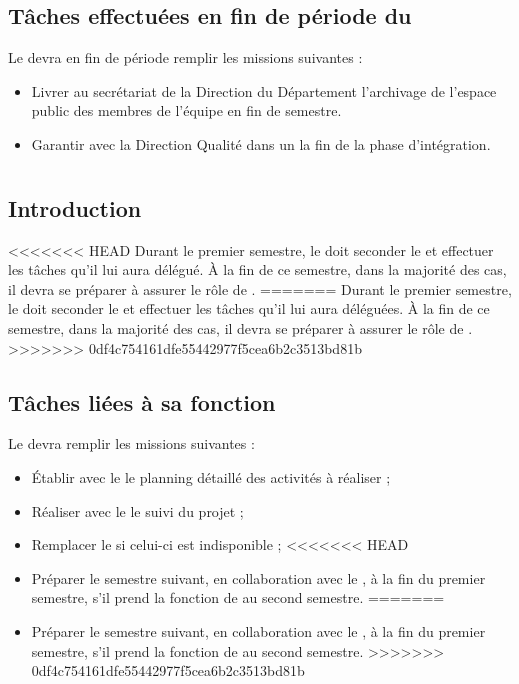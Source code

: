\subsection*{Tâches effectuées en fin de période du \PICCourt}

Le \CP{} devra en fin de période remplir les missions suivantes :
\begin{itemize}
	\item Livrer au secrétariat de la Direction du Département \ASICourt{} l’archivage de l’espace public des membres de l’équipe en fin de semestre.
	\item Garantir avec la Direction Qualité dans un \PVCourt{} la fin de la phase d’intégration.
\end{itemize}
\newpage

\section{\CPA}
\subsection*{Introduction}

<<<<<<< HEAD
Durant le premier semestre, le \CPA{} doit seconder le \CP{} et effectuer les tâches qu’il lui aura délégué. À la fin de ce semestre, dans la majorité des cas, il devra se préparer à assurer le rôle de \CP.
=======
Durant le premier semestre, le \CPA{} doit seconder le \CP{} et effectuer les tâches qu’il lui aura déléguées. À la fin de ce semestre, dans la majorité des cas, il devra se préparer à assurer le rôle de \CP.
>>>>>>> 0df4c754161dfe55442977f5cea6b2c3513bd81b

\subsection*{Tâches liées à sa fonction}

Le \CPA{} devra remplir les missions suivantes :
\begin{itemize}
	\item Établir avec le \CP{} le planning détaillé des activités à réaliser ;
	\item Réaliser avec le \CP{} le suivi du projet ;
	\item Remplacer le \CP{} si celui-ci est indisponible ;
<<<<<<< HEAD
	\item Préparer le semestre suivant, en collaboration avec le \CP, à la fin du premier semestre, s’il prend la fonction de \CP{} au second semestre.
=======
	\item Préparer le semestre suivant, en collaboration avec le \CP{}, à la fin du premier semestre, s’il prend la fonction de \CP{} au second semestre.
>>>>>>> 0df4c754161dfe55442977f5cea6b2c3513bd81b
\end{itemize}

